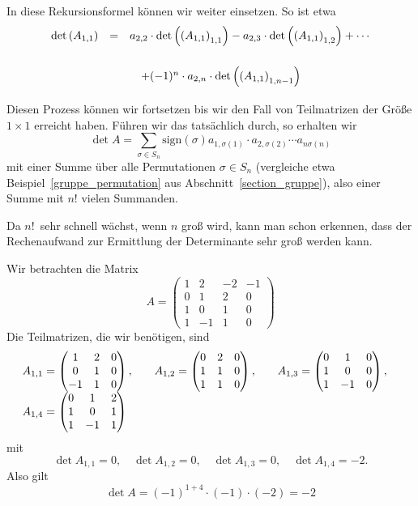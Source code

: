 \begin{notiz}\label{determinant_permut} In diese Rekursionsformel können wir weiter einsetzen. So ist etwa
  	$$ \begin{array} {l c l}
	\det{A_{1,1}} & = &  a_{2,2} \cdot \det{\left(A_{1,1}\right)_{1,1}} 
	- a_{2,3} \cdot \det{\left(A_{1,1}\right)_{1,2}} + \cdots  \\
	& & \quad + (-1)^{n} \cdot a_{2,n} \cdot \det{\left(A_{1,1}\right)_{1,n-1}} 
	\end{array} $$
Diesen Prozess können wir fortsetzen bis wir den Fall von Teilmatrizen der Größe $1 \times 1$ erreicht 
haben. Führen wir das tatsächlich durch, so erhalten wir
  	$$ \det{A} = \sum_{\sigma \in S_n} \textrm{sign}(\sigma) a_{1,\sigma(1)} \cdot  a_{2, \sigma(2)} \cdots 
	a_{n \sigma(n)} $$
mit einer Summe über alle Permutationen $\sigma \in S_n$ (vergleiche etwa Beispiel~\ref{gruppe_permutation} 
aus Abschnitt~\ref{section_gruppe}), also einer Summe mit $n!$ vielen Summanden. 

Da $n!\,$ sehr schnell wächst, wenn $n$ groß wird, kann man schon erkennen, dass der Rechenaufwand zur 
Ermittlung der Determinante sehr groß werden kann.
\end{notiz}

\begin{beispiel} Wir betrachten die Matrix
  	$$ A = \left( \begin{matrix} 1 & 2 & -2 & - 1 \\ 0 & 1 & 2 & 0 \\ 1 & 0 & 1 & 0 \\ 1 & -1 & 1 & 0 
	\end{matrix} \right) $$
Die Teilmatrizen, die wir benötigen, sind
  	$$ \begin{array} {l c c}
   	A_{1,1} = \left( \begin{matrix} 1 & 2 & 0 \\ 0 & 1 & 0 \\ -1 & 1 & 0 \end{matrix} \right), \quad &
   	A_{1,2} = \left( \begin{matrix} 0 & 2 & 0 \\ 1 & 1 & 0 \\  1 & 1 & 0 \end{matrix} \right), \quad &
   	A_{1,3} = \left( \begin{matrix} 0 & 1 & 0 \\ 1 & 0 & 0 \\  1 & -1 & 0 \end{matrix} \right), \quad \\
  	A_{1,4} = \left( \begin{matrix} 0 & 1 & 2 \\ 1 & 0 & 1 \\  1 & -1 & 1 \end{matrix} \right) 
  	\end{array} $$
mit 
  $$ \det{A_{1,1}} = 0, \quad \det{A_{1,2}} = 0, \quad \det{A_{1,3}} = 0, \quad \det{A_{1,4}} = -2. $$
Also gilt
  $$ \det{A} = (-1)^{1+4}\cdot (-1) \cdot (-2) = -2 $$
\end{beispiel}

